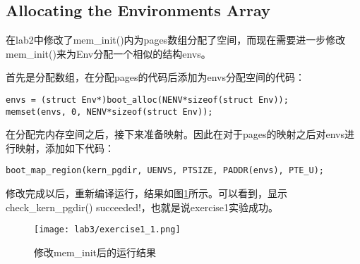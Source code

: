 \subsection{Allocating the Environments Array}
\par 在lab2中修改了mem\_init()内为pages数组分配了空间，而现在需要进一步修改mem\_init()来为Env分配一个相似的结构envs。
\begin{exerciseSolution}{1}
    \par 首先是分配数组，在分配pages的代码后添加为envs分配空间的代码：
    \begin{lstlisting}
envs = (struct Env*)boot_alloc(NENV*sizeof(struct Env));
memset(envs, 0, NENV*sizeof(struct Env));
    \end{lstlisting}
    \par 在分配完内存空间之后，接下来准备映射。因此在对于pages的映射之后对envs进行映射，添加如下代码：
    \begin{lstlisting}
boot_map_region(kern_pgdir, UENVS, PTSIZE, PADDR(envs), PTE_U);
    \end{lstlisting}

    \par 修改完成以后，重新编译运行，结果如图\ref{fig:lab3/exercise1_1}所示。可以看到，显示check\_kern\_pgdir() succeeded!，也就是说exercise1实验成功。
    \begin{figure}[htb]
        \centering
        \texttt{[image: lab3/exercise1\_1.png]}
        \caption{修改mem\_init后的运行结果}
        \label{fig:lab3/exercise1_1}
    \end{figure}
    \FloatBarrier
\end{exerciseSolution}

